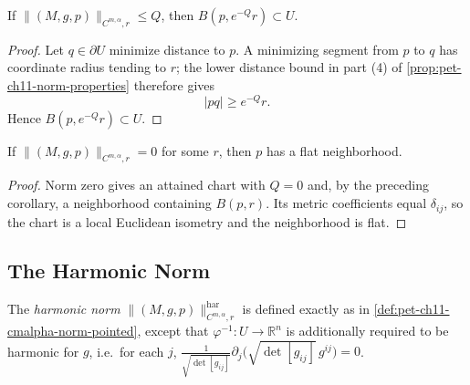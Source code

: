 \begin{corollary}
  \label{cor:pet-ch11-norm-bound-ball-containment}

  If $\|(M,g,p)\|_{C^{m,\alpha},r}\le Q$, then $B(p,e^{-Q}r)\subset U$.
\end{corollary}
\begin{proof}
  \sketch
  Let \(q\in\partial U\) minimize distance to \(p\). A minimizing segment from \(p\) to \(q\) has coordinate radius tending to \(r\); the lower distance bound in part (4) of \cref{prop:pet-ch11-norm-properties} therefore gives
  \[
    |pq|\ge e^{-Q}r.
  \]
  Hence \(B(p,e^{-Q}r)\subset U\).
\end{proof}


\begin{corollary}
  \label{cor:pet-ch11-norm-zero-implies-flat}

  If $\|(M,g,p)\|_{C^{m,\alpha},r}=0$ for some $r$, then $p$ has a flat
  neighborhood.
\end{corollary}
\begin{proof}
  \sketch
  Norm zero gives an attained chart with \(Q=0\) and, by the preceding corollary, a neighborhood containing \(B(p,r)\). Its metric coefficients equal \(\delta_{ij}\), so the chart is a local Euclidean isometry and the neighborhood is flat.
\end{proof}


\subsection{The Harmonic Norm}

\begin{definition}
  \label{def:pet-ch11-harmonic-norm}

  The \emph{harmonic norm} $\|(M,g,p)\|^{\mathrm{har}}_{C^{m,\alpha},r}$ is
  defined exactly as in \cref{def:pet-ch11-cmalpha-norm-pointed}, except that
  $\varphi^{-1}:U\to\mathbb{R}^n$ is additionally required to be harmonic for
  $g$, i.e.\ for each $j$,
  $\frac1{\sqrt{\det[g_{ij}]}}\partial_j\big(\sqrt{\det[g_{ij}]}\,g^{ij}\big)=0$.
\end{definition}

